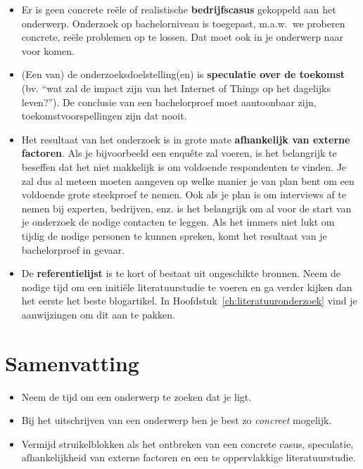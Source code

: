 \begin{itemize}
  \item Er is geen concrete reële of realistische \textbf{bedrijfscasus} gekoppeld aan het onderwerp. Onderzoek op bachelorniveau is toegepast, m.a.w.~we proberen concrete, reële problemen op te lossen. Dat moet ook in je onderwerp naar voor komen.
  \item (Een van) de onderzoeksdoelstelling(en) is \textbf{speculatie over de toekomst} (bv. ``wat zal de impact zijn van het Internet of Things op het dagelijks leven?''). De conclusie van een bachelorproef moet aantoonbaar zijn, toekomstvoorspellingen zijn dat nooit.
  \item Het resultaat van het onderzoek is in grote mate \textbf{afhankelijk van externe factoren}. Als je bijvoorbeeld een enquête zal voeren, is het belangrijk te beseffen dat het niet makkelijk is om voldoende respondenten te vinden. Je zal dus al meteen moeten aangeven op welke manier je van plan bent om een voldoende grote steekproef te nemen. Ook als je plan is om interviews af te nemen bij experten, bedrijven, enz. is het belangrijk om al voor de start van je onderzoek de nodige contacten te leggen. Als het immers niet lukt om tijdig de nodige personen te kunnen spreken, komt het resultaat van je bachelorproef in gevaar.
  \item De \textbf{referentielijst} is te kort of bestaat uit ongeschikte bronnen. Neem de nodige tijd om een initiële literatuurstudie te voeren en ga verder kijken dan het eerste het beste blogartikel. In Hoofdstuk~\ref{ch:literatuuronderzoek} vind je aanwijzingen om dit aan te pakken.
\end{itemize}

\section{Samenvatting}
\label{sec:onderwerp_samenvatting}

\begin{itemize}
  \item Neem de tijd om een onderwerp te zoeken dat je ligt.
  \item Bij het uitschrijven van een onderwerp ben je best zo \emph{concreet} mogelijk.
  \item Vermijd struikelblokken als het ontbreken van een concrete casus, speculatie, afhankelijkheid van externe factoren en een te oppervlakkige literatuurstudie.
\end{itemize}

